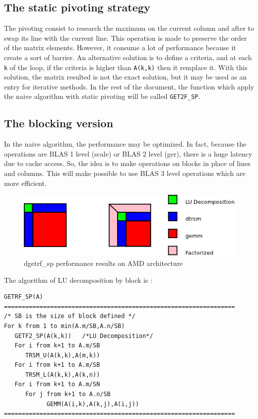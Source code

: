 \documentclass{report}
\begin{document}
\subsection{The static pivoting strategy}
The pivoting consist to research the maximum on the current column and after to swap its line with the current line. This operation is made to preserve the order of the matrix elements. However, it consume a lot of performance because it create a sort of barrier. An alternative solution is to define a criteria, and at each \texttt{k} of the loop, if the criteria is higher than \texttt{A(k,k)} then it remplace it. With this solution, the matrix resulted is not the exact solution, but it may be used as an entry for iterative methods. In the rest of the document, the function which apply the naive algorithm with static pivoting will be called \texttt{GET2F\_SP}.
\subsection{The blocking version}
In the naive algorithm, the performance may be optimized. In fact, because the operations are BLAS 1 level (scale) or BLAS 2 level (ger), there is a huge latency due to cache access. So, the idea is to make operations on blocks in place of lines and columns. This will make possible to use BLAS 3 level operations which are more efficient.\\
\begin{figure}[!h]
\begin{center}
\includegraphics[width=\textwidth]{lu_decomposition_block.png} 
\end{center}
\caption{dgetrf\_sp performance results on AMD architecture}
\end{figure}

The algorithm of LU decomposition by block is :
\begin{verbatim}
GETRF_SP(A)
=================================================================
/* SB is the size of block defined */
For k from 1 to min(A.m/SB,A.n/SB)
   GETF2_SP(A(k,k))   /*LU Decomposition*/
   For i from k+1 to A.m/SB
      TRSM_U(A(k,k),A(m,k))
   For i from k+1 to A.m/SB
      TRSM_L(A(k,k),A(k,n))
   For i from k+1 to A.m/SN
      For j from k+1 to A.n/SB
            GEMM(A(i,k),A(k,j),A(i,j))
=================================================================
\end{verbatim}
\end{document}
